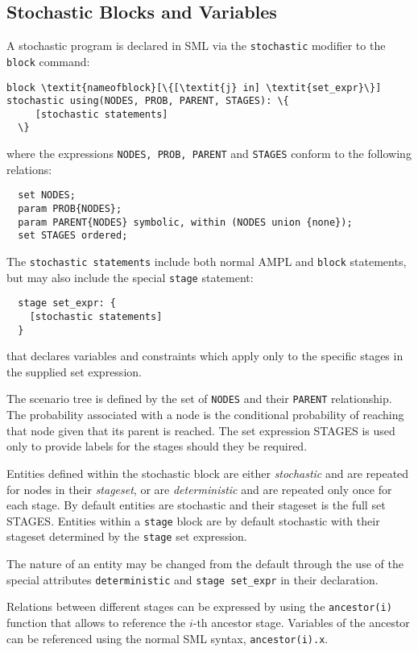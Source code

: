 \documentclass[10pt,a4paper]{book}
\begin{document}
\begin{verbtaim}
\section{Stochastic Blocks and Variables}
A stochastic program is declared in SML via the {\tt stochastic} modifier
to the {\tt block} command:
\begin{Verbatim}[commandchars=\\\{\}]
  block \textit{nameofblock}[\{[\textit{j} in] \textit{set_expr}\}] stochastic using(NODES, PROB, PARENT, STAGES): \{
     [stochastic statements]
  \}
\end{Verbatim}
where the expressions {\tt NODES, PROB, PARENT} and {\tt STAGES} conform to
the following relations:
\begin{verbatim}
  set NODES; 
  param PROB{NODES};
  param PARENT{NODES} symbolic, within (NODES union {none});
  set STAGES ordered;  
\end{verbatim}
The {\tt stochastic statements} include both normal AMPL and {\tt block}
statements, but may also include the special {\tt stage} statement:
\begin{verbatim}
  stage set_expr: {
    [stochastic statements]
  }
\end{verbatim}
that declares variables and constraints which apply only to the specific stages
in the supplied set expression.

The scenario tree is defined by the set of {\tt NODES} and their {\tt PARENT}
relationship. The probability associated with a node is the conditional
probability of reaching that node given that its parent is reached. The
set expression STAGES is used only to provide labels for the stages should
they be required.

Entities defined within the stochastic block are either {\it stochastic} and
are repeated for nodes in their {\it stageset}, or are {\it deterministic} and
are repeated only once for each stage. By default entities are stochastic
and their stageset is the full set STAGES. Entities within a {\tt stage} block
are by default stochastic with their stageset determined by the {\tt stage} set
expression.

The nature of an entity may be changed from the default through the use of the
special attributes {\tt deterministic} and {\tt stage set\_expr} in their
declaration.

Relations between different stages can be expressed by using the 
{\tt ancestor(i)} function that allows to reference the $i$-th ancestor
stage. Variables of the ancestor can be referenced using the normal SML syntax,
{\tt ancestor(i).x}.


\end{verbtaim}
\end{document}
